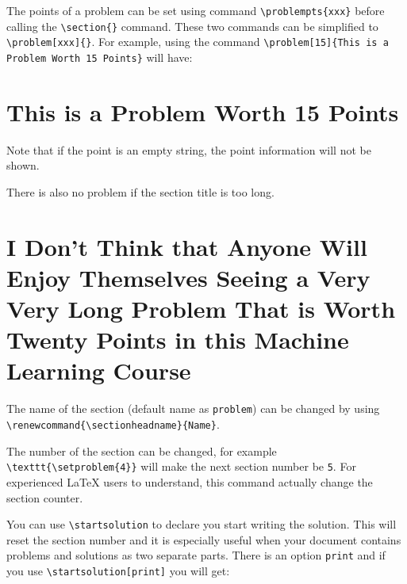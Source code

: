 \documentclass[twoside]{seu-ml-assign}
\renewcommand{\sectionheadname}{Section}
\begin{document}

      The points of a problem can be set using command \verb|\problempts{xxx}| before calling the \verb|\section{}| command.
      These two commands can be simplified to \verb|\problem[xxx]{}|.
      For example, using the command \verb|\problem[15]{This is a Problem Worth 15 Points}| will have:\vspace{-8mm}

      \renewcommand{\sectionheadname}{Problem}

      \section*{This is a Problem Worth 15 Points}
      Note that if the point is an empty string, the point information will not be shown.

      There is also no problem if the section title is too long.\vspace{-8mm}

      \section*{I Don't Think that Anyone Will Enjoy Themselves Seeing a Very Very Long Problem That is Worth Twenty Points in this Machine Learning Course}

      \renewcommand{\sectionheadname}{Section}

      The name of the section (default name as \texttt{problem}) can be changed by using \verb|\renewcommand{\sectionheadname}{Name}|.

    The number of the section can be changed, for example \verb|\texttt{\setproblem{4}}| will make the next section number be \texttt{5}.
    For experienced \LaTeX{} users to understand, this command actually change the section counter.

    You can use \verb|\startsolution| to declare you start writing the solution.
    This will reset the section number and it is especially useful when your document contains problems and solutions as two separate parts.
    There is an option \texttt{print} and if you use \verb|\startsolution[print]| you will get:
\end{document}
